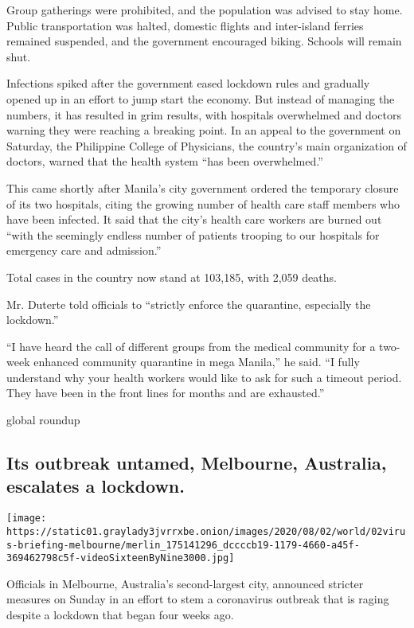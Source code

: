 Group gatherings were prohibited, and the population was advised to stay
home. Public transportation was halted, domestic flights and
inter-island ferries remained suspended, and the government encouraged
biking. Schools will remain shut.

Infections spiked after the government eased lockdown rules and
gradually opened up in an effort to jump start the economy. But instead
of managing the numbers, it has resulted in grim results, with hospitals
overwhelmed and doctors warning they were reaching a breaking point. In
an appeal to the government on Saturday, the Philippine College of
Physicians, the country's main organization of doctors, warned that the
health system ``has been overwhelmed.''

This came shortly after Manila's city government ordered the temporary
closure of its two hospitals, citing the growing number of health care
staff members who have been infected. It said that the city's health
care workers are burned out ``with the seemingly endless number of
patients trooping to our hospitals for emergency care and admission.''

Total cases in the country now stand at 103,185, with 2,059 deaths.

Mr. Duterte told officials to ``strictly enforce the quarantine,
especially the lockdown.''

``I have heard the call of different groups from the medical community
for a two-week enhanced community quarantine in mega Manila,'' he said.
``I fully understand why your health workers would like to ask for such
a timeout period. They have been in the front lines for months and are
exhausted.''

global roundup

\hypertarget{its-outbreak-untamed-melbourne-australia-escalates-a-lockdown}{%
\subsection{Its outbreak untamed, Melbourne, Australia, escalates a
lockdown.}\label{its-outbreak-untamed-melbourne-australia-escalates-a-lockdown}}

\texttt{[image: https://static01.graylady3jvrrxbe.onion/images/2020/08/02/world/02virus-briefing-melbourne/merlin\_175141296\_dccccb19-1179-4660-a45f-369462798c5f-videoSixteenByNine3000.jpg]}

Officials in Melbourne, Australia's second-largest city, announced
stricter measures on Sunday in an effort to stem a coronavirus outbreak
that is raging despite a lockdown that began four weeks ago.

